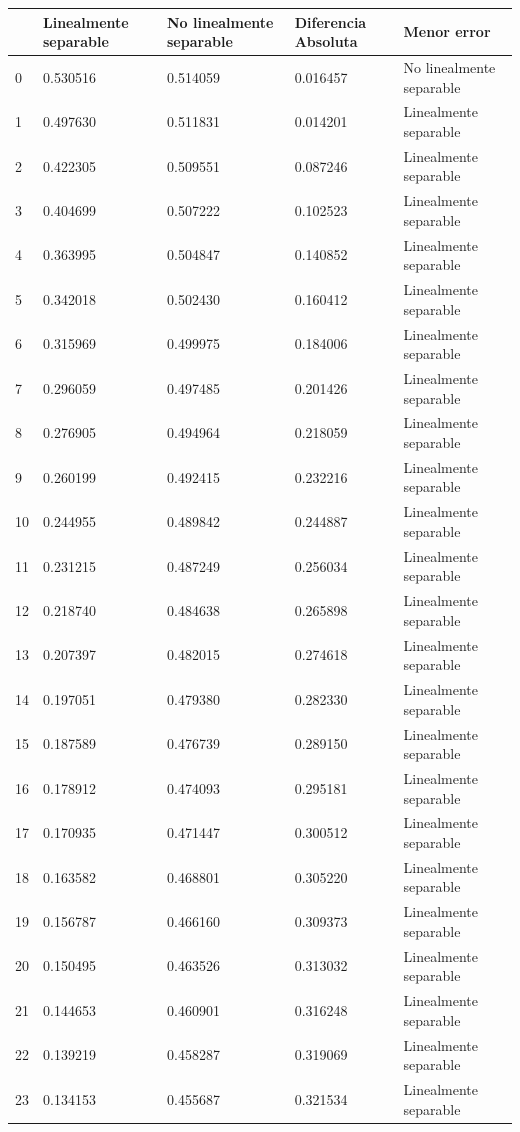\begin{tabular}{lllll}
\toprule
 & Linealmente separable & No linealmente separable & Diferencia Absoluta & Menor error \\
\midrule
0 & 0.530516 & 0.514059 & 0.016457 & No linealmente separable \\
1 & 0.497630 & 0.511831 & 0.014201 & Linealmente separable \\
2 & 0.422305 & 0.509551 & 0.087246 & Linealmente separable \\
3 & 0.404699 & 0.507222 & 0.102523 & Linealmente separable \\
4 & 0.363995 & 0.504847 & 0.140852 & Linealmente separable \\
5 & 0.342018 & 0.502430 & 0.160412 & Linealmente separable \\
6 & 0.315969 & 0.499975 & 0.184006 & Linealmente separable \\
7 & 0.296059 & 0.497485 & 0.201426 & Linealmente separable \\
8 & 0.276905 & 0.494964 & 0.218059 & Linealmente separable \\
9 & 0.260199 & 0.492415 & 0.232216 & Linealmente separable \\
10 & 0.244955 & 0.489842 & 0.244887 & Linealmente separable \\
11 & 0.231215 & 0.487249 & 0.256034 & Linealmente separable \\
12 & 0.218740 & 0.484638 & 0.265898 & Linealmente separable \\
13 & 0.207397 & 0.482015 & 0.274618 & Linealmente separable \\
14 & 0.197051 & 0.479380 & 0.282330 & Linealmente separable \\
15 & 0.187589 & 0.476739 & 0.289150 & Linealmente separable \\
16 & 0.178912 & 0.474093 & 0.295181 & Linealmente separable \\
17 & 0.170935 & 0.471447 & 0.300512 & Linealmente separable \\
18 & 0.163582 & 0.468801 & 0.305220 & Linealmente separable \\
19 & 0.156787 & 0.466160 & 0.309373 & Linealmente separable \\
20 & 0.150495 & 0.463526 & 0.313032 & Linealmente separable \\
21 & 0.144653 & 0.460901 & 0.316248 & Linealmente separable \\
22 & 0.139219 & 0.458287 & 0.319069 & Linealmente separable \\
23 & 0.134153 & 0.455687 & 0.321534 & Linealmente separable \\

\end{tabular}
